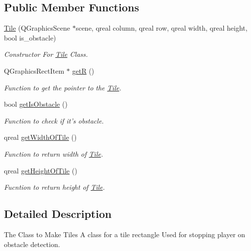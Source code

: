 \subsection*{Public Member Functions}
\begin{DoxyCompactItemize}
\item 
\hyperlink{classTile_a0c8a68113931418daaefdb0b868de535}{Tile} (Q\-Graphics\-Scene $\ast$scene, qreal column, qreal row, qreal width, qreal height, bool is\-\_\-obstacle)
\begin{DoxyCompactList}\small\item\em Constructor For \hyperlink{classTile}{Tile} Class. \end{DoxyCompactList}\item 
Q\-Graphics\-Rect\-Item $\ast$ \hyperlink{classTile_a5f75e3b66eb0770ce484fd3a29ba5d02}{get\-R} ()
\begin{DoxyCompactList}\small\item\em Function to get the pointer to the \hyperlink{classTile}{Tile}. \end{DoxyCompactList}\item 
bool \hyperlink{classTile_af7ad6e5f284e0888004d06ace947e9ae}{get\-Is\-Obstacle} ()
\begin{DoxyCompactList}\small\item\em Function to check if it's obstacle. \end{DoxyCompactList}\item 
qreal \hyperlink{classTile_a6e0d374fddc0462cb7f18ea06bd1ea92}{get\-Width\-Of\-Tile} ()
\begin{DoxyCompactList}\small\item\em Function to return width of \hyperlink{classTile}{Tile}. \end{DoxyCompactList}\item 
qreal \hyperlink{classTile_a785e906801dfd6a3bf9d5538bb2ed51e}{get\-Height\-Of\-Tile} ()
\begin{DoxyCompactList}\small\item\em Fucntion to return height of \hyperlink{classTile}{Tile}. \end{DoxyCompactList}\end{DoxyCompactItemize}


\subsection{Detailed Description}
The Class to Make Tiles A class for a tile rectangle Used for stopping player on obstacle detection. 

